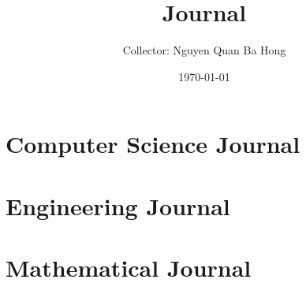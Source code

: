 \documentclass{article}
\title{Journal}
\author{Collector: Nguyen Quan Ba Hong}
\date{\today}
\numberwithin{equation}{section}
\begin{document}
\maketitle
\tableofcontents


\section{Computer Science Journal}

\section{Engineering Journal}

\section{Mathematical Journal}
\end{document}
